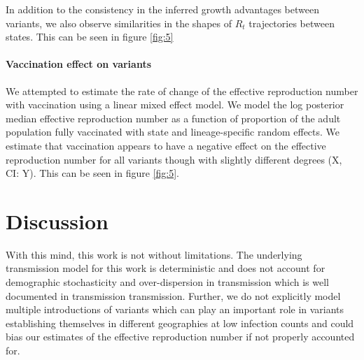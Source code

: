 \documentclass[12pt]{article}
\begin{document}
In addition to the consistency in the inferred growth advantages between variants, we also observe similarities in the shapes of $R_{t}$ trajectories between states. This can be seen in figure \ref{fig:5} %

\paragraph{Vaccination effect on variants}

We attempted to estimate the rate of change of the effective reproduction number with vaccination using a linear mixed effect model. We model the log posterior median effective reproduction number as a function of proportion of the adult population fully vaccinated with state and lineage-specific random effects. We estimate that vaccination appears to have a negative effect on the effective reproduction number for all variants though with slightly different degrees (X, CI: Y). This can be seen in figure \ref{fig:5}.


\section{Discussion}%


With this mind, this work is not without limitations.
The underlying transmission model for this work is deterministic and does not account for demographic stochasticity and over-dispersion in transmission which is well documented in transmission transmission.
Further, we do not explicitly model multiple introductions of variants which can play an important role in variants establishing themselves in different geographies at low infection counts and could bias our estimates of the effective reproduction number if not properly accounted for.
\end{document}
